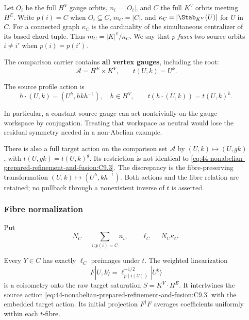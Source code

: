 Let $O_i$ be the full $H^V$ gauge orbits, $n_i=|O_i|$, and $C$ the full $K^V$
orbits meeting $H^E$.  Write $p(i)=C$ when $O_i\subseteq C$, $m_C=|C|$, and
$\kappa_C=|\Stab_{K^V}(U)|$ for $U$ in $C$.  For a connected graph $\kappa_C$
is the cardinality of the simultaneous centralizer of its based chord tuple.
Thus $m_C=|K|^v/\kappa_C$.  We say that $p$ \emph{fuses} two source orbits
$i\ne i'$ when $p(i)=p(i')$.

The comparison carrier contains \textbf{all vertex gauges}, including the root:
\begin{equation}
\mathcal A=H^E\times K^V,\qquad t(U,k)=U^k.
 \label{eq:44-nonabelian-prepared-refinement-and-fusion:C9.2}
\end{equation}

The source profile action is
\begin{equation}
h\cdot(U,k)=(U^h,hkh^{-1}),\quad h\in H^V,
 \qquad t(h\cdot(U,k))=t(U,k)^h.
 \label{eq:44-nonabelian-prepared-refinement-and-fusion:C9.3}
\end{equation}

In particular, a constant source gauge can act nontrivially on the gauge
workspace by conjugation.  Treating that workspace as neutral would lose
the residual symmetry needed in a non-Abelian example.

There is also a full target action on the comparison set $\mathcal A$ by
$(U,k)\mapsto(U,gk)$, with $t(U,gk)=t(U,k)^g$.  Its restriction is not
identical to \eqref{eq:44-nonabelian-prepared-refinement-and-fusion:C9.3}.
The discrepancy is the fibre-preserving transformation
$(U,k)\mapsto(U^h,kh^{-1})$.  Both actions and the fibre relation are retained;
no pullback through a nonexistent inverse of $t$ is asserted.

\subsubsection{Fibre normalization}\label{md:44-nonabelian-prepared-refinement-and-fusion:fibre-normalization}

Put
\begin{equation}
N_C=\sum_{i:p(i)=C}n_i,\qquad \ell_C=N_C\kappa_C.
 \label{eq:44-nonabelian-prepared-refinement-and-fusion:C9.4}
\end{equation}

\begin{proposition}\label{prop:fibre-normalization}
Every $Y\in C$ has exactly $\ell_C$ preimages under $t$.  The weighted
linearization
\begin{equation}
F|U,k\rangle=\ell_{p(i(U))}^{-1/2}|U^k\rangle
 \label{eq:44-nonabelian-prepared-refinement-and-fusion:C9.5}
\end{equation}
is a coisometry onto the raw target saturation $S=K^V\cdot H^E$.  It
intertwines the source action
\eqref{eq:44-nonabelian-prepared-refinement-and-fusion:C9.3} with the embedded
target action.  Its initial projection $F^\dagger F$ averages coefficients
uniformly within each $t$-fibre.
\end{proposition}

